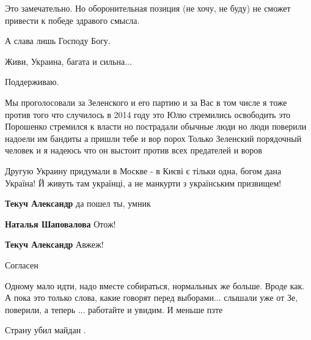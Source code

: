 \begin{itemize}
Это замечательно.
Но оборонительная позиция (не хочу, не буду) не сможет привести к победе здравого смысла.

А слава лишь Господу Богу.

Живи, Украина, багата и сильна...

Поддерживаю.


Мы проголосовали за Зеленского и его партию и за Вас в том числе я тоже против
того что случилось в 2014 году это Юлю стремились освободить это Порошенко
стремился к власти но пострадали обычные люди но люди поверили надоели им
бандиты а пришли тебе и вор порох Только Зеленский порядочный человек и я
надеюсь что он выстоит против всех предателей и воров


Другую Украину придумали в Москве - в Києві є тільки одна, богом дана Україна!
Й живуть там українці, а не манкурти з українським призвищем!

\begin{itemize} %
\textbf{Текуч Александр} да пошел ты, умник

\textbf{Наталья Шаповалова} Отож!

\textbf{Текуч Александр} Авжеж!
\end{itemize} %

Согласен


Одному мало идти, надо вместе собираться, нормальных же больше. Вроде как. А
пока это только слова, какие говорят перед выборами... слышали уже от Зе,
поверили, а теперь ... работайте и увидим. И меньше пзте

Страну убил майдан .

\end{itemize} %
